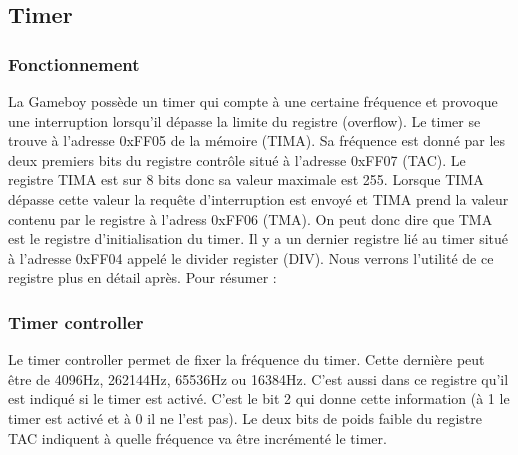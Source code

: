 \documentclass[a4paper]{article}
\begin{document}

\subsection{Timer}
\subsubsection{Fonctionnement}
La Gameboy possède un timer qui compte à une certaine fréquence et provoque une
interruption lorsqu'il dépasse la limite du registre (overflow). Le timer se trouve
à l'adresse 0xFF05 de la mémoire (TIMA). Sa fréquence est donné par les deux premiers
bits du registre contrôle situé à l'adresse 0xFF07 (TAC). Le registre TIMA est sur 8 bits donc
sa valeur maximale est 255. Lorsque TIMA dépasse cette valeur la requête d'interruption
est envoyé et TIMA prend la valeur contenu par le registre à l'adress 0xFF06 (TMA).
On peut donc dire que TMA est le registre d'initialisation du timer. Il y a un
dernier registre lié au timer situé à l'adresse 0xFF04 appelé le divider register
(DIV). Nous verrons l'utilité de ce registre plus en détail après. Pour résumer :
\begin{center}
\end{center}

\subsubsection{Timer controller}
Le timer controller permet de fixer la fréquence du timer. Cette dernière peut être
de 4096Hz, 262144Hz, 65536Hz ou 16384Hz. C'est aussi dans ce registre qu'il est indiqué
si le timer est activé. C'est le bit 2 qui donne cette information (à 1 le timer
est activé et à 0 il ne l'est pas). Le deux bits de poids faible du registre TAC
indiquent à quelle fréquence va être incrémenté le timer.
\begin{center}
\end{center}
\end{document}
